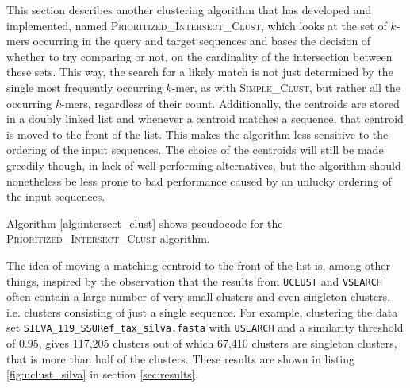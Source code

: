 This section describes another clustering algorithm that has developed and
implemented, named \textsc{Prioritized\_Intersect\_Clust}, which looks at the
set of $k$-mers occurring in the query and target sequences and bases the
decision of whether to try comparing or not, on the cardinality of the
intersection between these sets. This way, the search for a likely match is not
just determined by the single most frequently occurring $k$-mer, as with
\textsc{Simple\_Clust}, but rather all the occurring $k$-mers, regardless of
their count. Additionally, the centroids are stored in a doubly linked list and
whenever a centroid matches a sequence, that centroid is moved to the front of
the list. This makes the algorithm less sensitive to the ordering of the input
sequences. The choice of the centroids will still be made greedily though, in
lack of well-performing alternatives, but the algorithm should nonetheless be
less prone to bad performance caused by an unlucky ordering of the input
sequences.

Algorithm \ref{alg:intersect_clust} shows pseudocode for the
\textsc{Prioritized\_Intersect\_Clust} algorithm.

The idea of moving a matching centroid to the front of the list is, among other
things, inspired by the observation that the results from \texttt{UCLUST} and
\texttt{VSEARCH} often contain a large number of very small clusters and even
singleton clusters, i.e. clusters consisting of just a single sequence. For
example, clustering the data set \texttt{SILVA\_119\_SSURef\_tax\_silva.fasta}
with \texttt{USEARCH} and a similarity threshold of $0.95$, gives 117,205
clusters out of which 67,410 clusters are singleton clusters, that is more than
half of the clusters. These results are shown in listing \ref{fig:uclust_silva}
in section \ref{sec:results}.


